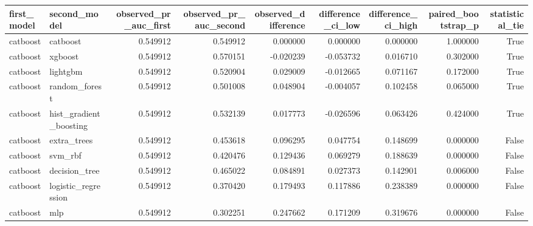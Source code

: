 \begin{tabular}{llrrrrrrr}
\toprule
first\_model & second\_model & observed\_pr\_auc\_first & observed\_pr\_auc\_second & observed\_difference & difference\_ci\_low & difference\_ci\_high & paired\_bootstrap\_p & statistical\_tie \\
\midrule
catboost & catboost & 0.549912 & 0.549912 & 0.000000 & 0.000000 & 0.000000 & 1.000000 & True \\
catboost & xgboost & 0.549912 & 0.570151 & -0.020239 & -0.053732 & 0.016710 & 0.302000 & True \\
catboost & lightgbm & 0.549912 & 0.520904 & 0.029009 & -0.012665 & 0.071167 & 0.172000 & True \\
catboost & random\_forest & 0.549912 & 0.501008 & 0.048904 & -0.004057 & 0.102458 & 0.065000 & True \\
catboost & hist\_gradient\_boosting & 0.549912 & 0.532139 & 0.017773 & -0.026596 & 0.063426 & 0.424000 & True \\
catboost & extra\_trees & 0.549912 & 0.453618 & 0.096295 & 0.047754 & 0.148699 & 0.000000 & False \\
catboost & svm\_rbf & 0.549912 & 0.420476 & 0.129436 & 0.069279 & 0.188639 & 0.000000 & False \\
catboost & decision\_tree & 0.549912 & 0.465022 & 0.084891 & 0.027373 & 0.142901 & 0.006000 & False \\
catboost & logistic\_regression & 0.549912 & 0.370420 & 0.179493 & 0.117886 & 0.238389 & 0.000000 & False \\
catboost & mlp & 0.549912 & 0.302251 & 0.247662 & 0.171209 & 0.319676 & 0.000000 & False \\
\bottomrule
\end{tabular}

